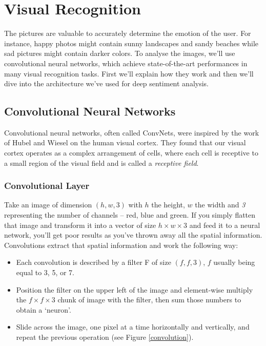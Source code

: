 \chapter{Visual Recognition}
The pictures are valuable to accurately determine the emotion of the user. For instance, happy photos might contain sunny landscapes and sandy beaches while sad pictures might contain darker colors. To analyse the images, we'll use convolutional neural networks, which achieve state-of-the-art performances in many visual recognition tasks. First we'll explain how they work and then we'll dive into the architecture we've used for deep sentiment analysis.
\section{Convolutional Neural Networks}
Convolutional neural networks, often called ConvNets, were inspired by the work of Hubel and Wiesel \cite{hubel} on the human visual cortex. They found that our visual cortex operates as a complex arrangement of cells, where each cell is receptive to a small region of the visual field and is called a {\em receptive field}.

\subsection{Convolutional Layer}
Take an image of dimension $(h,w,3)$ with $h$ the height, $w$ the width and {\em3} representing the number of channels -- red, blue and green. If you simply flatten that image and transform it into a vector of size $h\times w \times 3$ and feed it to a neural network, you'll get poor results as you've thrown away all the spatial information. Convolutions extract that spatial information and work the following way:
\begin{itemize}
    \item Each convolution is described by a filter F of size $(f, f, 3)$, $f$ usually being equal to 3, 5, or 7.
    \item Position the filter on the upper left of the image and element-wise multiply the $f\times f \times 3$ chunk of image with the filter, then sum those numbers to 
    obtain a `neuron'.
    \item Slide across the image, one pixel at a time horizontally and vertically, and repeat the previous operation (see Figure \ref{convolution}).
\end{itemize}

